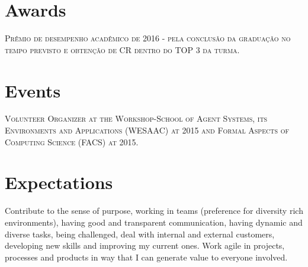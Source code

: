 \documentclass[a4paper,10pt]{article}
\begin{document}
\section {Awards}
\textsc{Prêmio de desempenho acadêmico de 2016 - pela conclusão da graduação no tempo previsto e obtenção de CR dentro do TOP 3 da turma.}

\section {Events}
\textsc{Volunteer Organizer at the Workshop-School of Agent Systems, its Environments and Applications (WESAAC) at 2015 and Formal Aspects of Computing Science (FACS) at 2015.}

\section {Expectations}
Contribute to the sense of purpose, working in teams (preference for diversity rich environments), having good and transparent communication, having dynamic and diverse tasks, being challenged, deal with internal and external customers, developing new skills and improving my current ones. Work agile in projects, processes and products in way that I can generate value to everyone involved.   
\end{document}
